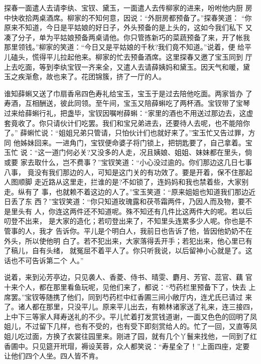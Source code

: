 探春一面遣人去请李纨、宝钗、黛玉，一面遣人去传柳家的进来，吩咐他内厨
房中快收拾两桌酒席。柳家的不知何意，因说：“外厨房都预备了。”探春笑道：
“你原来不知道，今日是平姑娘的好日子，外头预备的是上头的，这如今我们私下
又凑了分子，单为平姑娘预备两桌请他。你只管拣新巧的菜蔬预备了来，开了帐我
那里领钱。”柳家的笑道：“今日又是平姑娘的千秋?我们竟不知道。”说着，便
给平儿磕头，慌得平儿拉起他来。柳家的忙去预备酒席。这里探春又邀了宝玉同到
厅上去吃面，等到李纨宝钗一齐来全，又遣人去请薛姨妈和黛玉。因天气和暖，黛
玉之疾渐愈，故也来了。花团锦簇，挤了一厅的人。

谁知薛蝌又送了巾扇香帛四色寿礼给宝玉，宝玉于是过去陪他吃面。两家皆办
了寿酒，互相酬送，彼此同领。至午间，宝玉又陪薛蝌吃了两杯酒。宝钗带了宝琴
过来给薛蝌行礼，把盏毕，宝钗因嘱咐薛蝌：“家里的酒也不用送过那边去，这虚
套竟收了。你只请伙计们吃罢。我们和宝兄弟进去，还要待人去呢，也不能陪你了。”
薛蝌忙说：“姐姐兄弟只管请，只怕伙计们也就好来了。”宝玉忙又告过罪，方同
他姊妹回来。一进角门，宝钗便命婆子将门锁上，把钥匙要了，自己拿着。宝玉忙
说：“这一道门何必关?又没多的人走，况且姨娘、姐姐、妹妹都在里头，倘或要
家去取什么，岂不费事？”宝钗笑道：“小心没过逾的。你们那边这几日七事八事，
竟没有我们那边的人，可知是这门关的有功效了。要是开着，保不住那起人图顺脚
走近路从这里走，拦谁的是?不如锁了，连妈妈和我也禁着些，大家别走。纵有了
事，也就赖不着这边的人了。”宝玉笑道：“原来姐姐也知道我们那边近日丢了东
西？”宝钗笑道：“你只知道玫瑰露和茯苓霜两件，乃因人而及物，要不是里头有
人，你连这两件还不知道呢。殊不知还有几件比这两件大的呢。若以后叨登不出来，
是大家的造化；若叨登出来了，不知里头连累多少人呢。你也是不管事的人，我才
告诉你。平儿是个明白人，我前日也告诉了他，皆因他奶奶不在外头，所以使他明
白了。若不犯出来，大家落得丢开手；若犯出来，他心里已有了稿儿，自有头绪，
就冤屈不着平人了。你只听我说，以后留神小心就是了。这话也不可告诉第二个
人。”

说着，来到沁芳亭边，只见袭人、香菱、侍书、晴雯、麝月、芳官、蕊官、藕
官十来个人，都在那里看鱼玩呢，见他们来了，都说：“芍药栏里预备下了，快去
上席罢。”宝钗等随携了他们，同到芍药栏中红香圃三间小敞厅内，连尤氏已请过
来了。诸人都在那里，只没平儿。原来平儿出去，有赖林诸家送了礼来，连三接四，
上中下三等家人拜寿送礼的不少。平儿忙着打发赏钱道谢，一面又色色的回明了凤
姐儿，不过留下几样，也有不受的，也有受下即刻赏给人的。忙了一回，又直等凤
姐儿吃过面，方换了衣裳往园里来。刚进了园，就有几个丫鬟来找他，一同到了红
香圃中。只见筵开玳瑁，褥设芙蓉，众人都笑说：“寿星全了！”上面四座，定要
让他们四个人坐。四人皆不肯。

